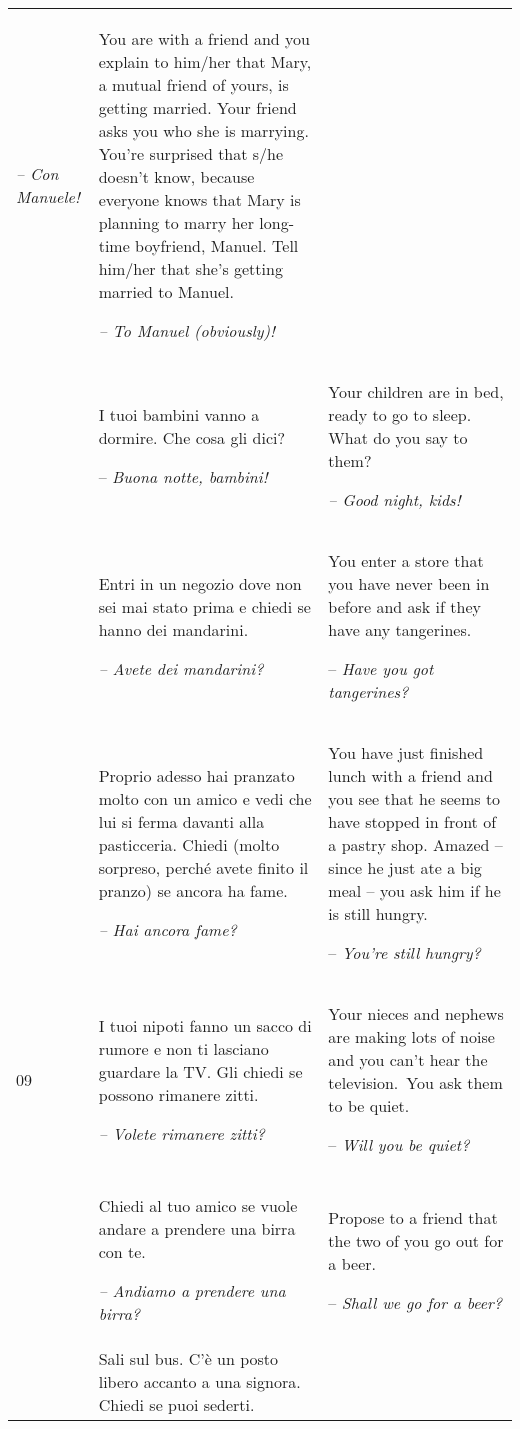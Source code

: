 \begin{xltabular}{\textwidth}{lQQ}
\textit{-- Con Manuele!} & You are with a friend and you explain to him/her that Mary, a mutual friend of yours, is getting married. Your friend asks you who she is marrying. You're surprised that s/he doesn’t know, because everyone knows that Mary is planning to marry her long-time boyfriend, Manuel. Tell him/her that she’s getting married to Manuel.

{\itshape -- To Manuel (obviously)!}\\
 & I tuoi bambini vanno a dormire. Che cosa gli dici?

-- \textit{Buona notte, bambini!} & Your children are in bed, ready to go to sleep. What do you say to them?

{\itshape -- Good night, kids!}\\
 & Entri in un negozio dove non sei mai stato prima e chiedi se hanno dei mandarini.

{\itshape -- Avete dei mandarini?} & You enter a store that you have never been in before and ask if they have any tangerines.

-- \textit{Have you got tangerines?}\\
 & Proprio adesso hai pranzato molto con un amico e vedi che lui si ferma davanti alla pasticceria. Chiedi (molto sorpreso, perché avete finito il pranzo) se ancora ha fame.

{\itshape -- Hai ancora fame?} & You have just finished lunch with a friend and you see that he seems to have stopped in front of a pastry shop. Amazed -- since he just ate a big meal -- you ask him if he is still hungry.

-- \textit{You’re still hungry?}\\
09 & I tuoi nipoti fanno un sacco di rumore e non ti lasciano guardare la TV. Gli chiedi se possono rimanere zitti.

\textit{-- Volete rimanere zitti?} & Your nieces and nephews are making lots of noise and you can’t hear the television.~You ask them to be quiet.

-- \textit{Will you be quiet?}\\
 & Chiedi al tuo amico se vuole andare a prendere una birra con te.

{\itshape -- Andiamo a prendere una birra?} & Propose to a friend that the two of you go out for a beer.

-- \textit{Shall we go for a beer?}\\
 & Sali sul bus. C'è un posto libero accanto a una signora. Chiedi se puoi sederti.


\end{xltabular}

